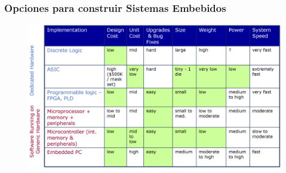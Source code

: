 \documentclass[10.5pt,scale=1.0,t,aspectratio=169,hyperref={pdfpagelabels=false}]{beamer}
\begin{document}
\begin{frame}
	\frametitle{Opciones para construir Sistemas Embebidos}
	\begin{figure}
		\centering
		\includegraphics[scale=0.35]{BuildEmbbededSystems}
	\end{figure}
\end{frame}
\end{document}
